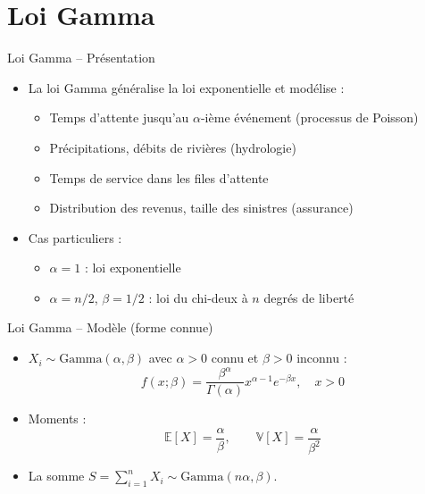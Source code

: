 \documentclass[11pt,aspectratio=169]{beamer}
\begin{document}
\section{Loi Gamma}

\begin{frame}{Loi Gamma -- Présentation}

\begin{itemize}

\item La loi Gamma généralise la loi exponentielle et modélise :\newline
  \begin{itemize}
    \item Temps d'attente jusqu'au $\alpha$-ième événement (processus de Poisson)\newline
    \item Précipitations, débits de rivières (hydrologie)\newline
    \item Temps de service dans les files d'attente\newline
    \item Distribution des revenus, taille des sinistres (assurance)\newline
  \end{itemize}

\item Cas particuliers :\newline
  \begin{itemize}
    \item $\alpha = 1$ : loi exponentielle\newline
    \item $\alpha = n/2$, $\beta = 1/2$ : loi du chi-deux à $n$ degrés de liberté
  \end{itemize}

\end{itemize}

\end{frame}

\begin{frame}{Loi Gamma -- Modèle (forme connue)}

\begin{itemize}

\item $X_i \sim \text{Gamma}(\alpha, \beta)$ avec $\alpha > 0$ connu et $\beta > 0$ inconnu :
  \[
  f(x; \beta) = \frac{\beta^\alpha}{\Gamma(\alpha)} x^{\alpha-1} e^{-\beta x}, \quad x > 0
  \]

\item Moments :
  \[
  \mathbb{E}[X] = \frac{\alpha}{\beta}, \qquad \mathbb{V}[X] = \frac{\alpha}{\beta^2}
  \]

\item La somme $S = \sum_{i=1}^n X_i \sim \text{Gamma}(n\alpha, \beta)$.

\end{itemize}

\end{frame}
\end{document}
